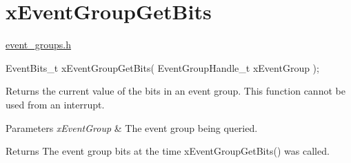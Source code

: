 \hypertarget{group__x_event_group_get_bits}{}\section{x\+Event\+Group\+Get\+Bits}
\label{group__x_event_group_get_bits}
\hyperlink{event__groups_8h_source}{event\+\_\+groups.\+h} 
\begin{DoxyPre}
   EventBits\_t xEventGroupGetBits( EventGroupHandle\_t xEventGroup );
\end{DoxyPre}


Returns the current value of the bits in an event group. This function cannot be used from an interrupt.


\begin{DoxyParams}{Parameters}
{\em x\+Event\+Group} & The event group being queried.\\
\hline
\end{DoxyParams}
\begin{DoxyReturn}{Returns}
The event group bits at the time x\+Event\+Group\+Get\+Bits() was called. 
\end{DoxyReturn}
